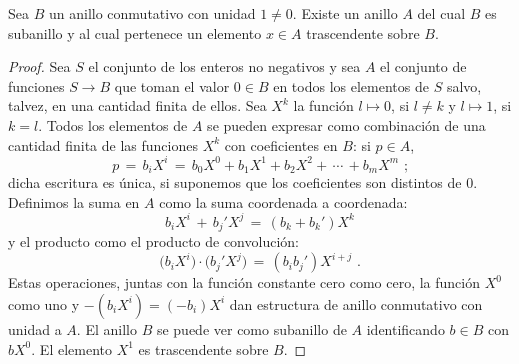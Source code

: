 
\begin{teoPolinomios}\label{teo:polinomios:anillo}
	Sea $B$ un anillo conmutativo con unidad $1\neq 0$. Existe un
	anillo $A$ del cual $B$ es subanillo y al cual pertenece un
	elemento $x\in A$ trascendente sobre $B$.
\end{teoPolinomios}

\begin{proof}
	Sea $S$ el conjunto de los enteros no negativos y sea $A$ el
	conjunto de funciones $S\rightarrow B$ que toman el valor
	$0\in B$ en todos los elementos de $S$ salvo, talvez, en una
	cantidad finita de ellos. Sea $X^k$ la funci\'on $l\mapsto 0$,
	si $l\neq k$ y $l\mapsto 1$, si $k=l$. Todos los elementos de $A$
	se pueden expresar como combinaci\'on de una cantidad finita de
	las funciones $X^k$ con coeficientes en $B$: si $p\in A$,
	\begin{displaymath}
		p\,=\,b_iX^i\,=\,b_0X^0+b_1X^1+b_2X^2+\,\cdots\,+b_mX^m
		\text{ ;}
	\end{displaymath}
	dicha escritura es \'unica, si suponemos que los coeficientes
	son distintos de $0$.
	Definimos la suma en $A$ como la suma coordenada a coordenada:
	\begin{displaymath}
		b_iX^i\,+\,b_j'X^j\,=\,(b_k+b_k')X^k
	\end{displaymath}
	y el producto como el producto de convoluci\'on:
	\begin{displaymath}
		\big(b_iX^i\big)\cdot\big(b_j'X^j\big)\,=\,
			(b_ib_j')X^{i+j}
		\text{ .}
	\end{displaymath}
	Estas operaciones, juntas con la funci\'on constante cero como cero,
	la funci\'on $X^0$ como uno y $-(b_iX^i)=(-b_i)X^i$ dan estructura
	de anillo conmutativo con unidad a $A$. El anillo $B$ se puede ver
	como subanillo de $A$ identificando $b\in B$ con $bX^0$.
	El elemento $X^1$ es trascendente sobre $B$.
\end{proof}

